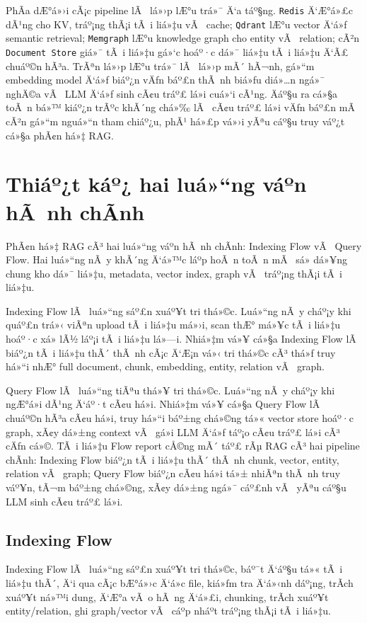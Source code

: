 ﻿\documentclass[12pt,a4paper]{report}
\begin{document}
PhÃ­a dÆ°á»›i cÃ¡c pipeline lÃ  lá»›p lÆ°u trá»¯ Ä‘a táº§ng. \texttt{Redis} Ä‘Æ°á»£c dÃ¹ng cho KV, tráº¡ng thÃ¡i tÃ i liá»‡u vÃ  cache; \texttt{Qdrant} lÆ°u vector Ä‘á»ƒ semantic retrieval; \texttt{Memgraph} lÆ°u knowledge graph cho entity vÃ  relation; cÃ²n \texttt{Document Store} giá»¯ tÃ i liá»‡u gá»‘c hoáº·c dá»¯ liá»‡u tÃ i liá»‡u Ä‘Ã£ chuáº©n hÃ³a. TrÃªn lá»›p lÆ°u trá»¯ lÃ  lá»›p mÃ´ hÃ¬nh, gá»“m embedding model Ä‘á»ƒ biáº¿n vÄƒn báº£n thÃ nh biá»ƒu diá»…n ngá»¯ nghÄ©a vÃ  LLM Ä‘á»ƒ sinh cÃ¢u tráº£ lá»i cuá»‘i cÃ¹ng. Äáº§u ra cá»§a toÃ n bá»™ kiáº¿n trÃºc khÃ´ng chá»‰ lÃ  cÃ¢u tráº£ lá»i vÄƒn báº£n mÃ  cÃ²n gá»“m nguá»“n tham chiáº¿u, phÃ¹ há»£p vá»›i yÃªu cáº§u truy váº¿t cá»§a phÃ¢n há»‡ RAG.

\section{Thiáº¿t káº¿ hai luá»“ng váº­n hÃ nh chÃ­nh}

PhÃ¢n há»‡ RAG cÃ³ hai luá»“ng váº­n hÃ nh chÃ­nh: Indexing Flow vÃ  Query Flow. Hai luá»“ng nÃ y khÃ´ng Ä‘á»™c láº­p hoÃ n toÃ n mÃ  sá»­ dá»¥ng chung kho dá»¯ liá»‡u, metadata, vector index, graph vÃ  tráº¡ng thÃ¡i tÃ i liá»‡u.

Indexing Flow lÃ  luá»“ng sáº£n xuáº¥t tri thá»©c. Luá»“ng nÃ y cháº¡y khi quáº£n trá»‹ viÃªn upload tÃ i liá»‡u má»›i, scan thÆ° má»¥c tÃ i liá»‡u hoáº·c xá»­ lÃ½ láº¡i tÃ i liá»‡u lá»—i. Nhiá»‡m vá»¥ cá»§a Indexing Flow lÃ  biáº¿n tÃ i liá»‡u thÃ´ thÃ nh cÃ¡c Ä‘Æ¡n vá»‹ tri thá»©c cÃ³ thá»ƒ truy há»“i nhÆ° full document, chunk, embedding, entity, relation vÃ  graph.

Query Flow lÃ  luá»“ng tiÃªu thá»¥ tri thá»©c. Luá»“ng nÃ y cháº¡y khi ngÆ°á»i dÃ¹ng Ä‘áº·t cÃ¢u há»i. Nhiá»‡m vá»¥ cá»§a Query Flow lÃ  chuáº©n hÃ³a cÃ¢u há»i, truy há»“i báº±ng chá»©ng tá»« vector store hoáº·c graph, xÃ¢y dá»±ng context vÃ  gá»i LLM Ä‘á»ƒ táº¡o cÃ¢u tráº£ lá»i cÃ³ cÄƒn cá»©. TÃ i liá»‡u Flow report cÅ©ng mÃ´ táº£ rÃµ RAG cÃ³ hai pipeline chÃ­nh: Indexing Flow biáº¿n tÃ i liá»‡u thÃ´ thÃ nh chunk, vector, entity, relation vÃ  graph; Query Flow biáº¿n cÃ¢u há»i tá»± nhiÃªn thÃ nh truy váº¥n, tÃ¬m báº±ng chá»©ng, xÃ¢y dá»±ng ngá»¯ cáº£nh vÃ  yÃªu cáº§u LLM sinh cÃ¢u tráº£ lá»i.

\subsection{Indexing Flow}

Indexing Flow lÃ  luá»“ng sáº£n xuáº¥t tri thá»©c, báº¯t Ä‘áº§u tá»« tÃ i liá»‡u thÃ´, Ä‘i qua cÃ¡c bÆ°á»›c Ä‘á»c file, kiá»ƒm tra Ä‘á»‹nh dáº¡ng, trÃ­ch xuáº¥t ná»™i dung, Ä‘Æ°a vÃ o hÃ ng Ä‘á»£i, chunking, trÃ­ch xuáº¥t entity/relation, ghi graph/vector vÃ  cáº­p nháº­t tráº¡ng thÃ¡i tÃ i liá»‡u.
\end{document}
